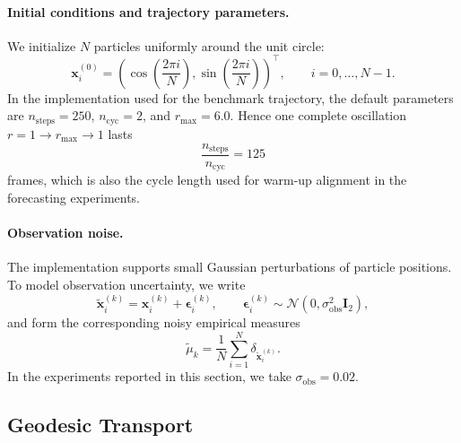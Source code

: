 \documentclass[11pt]{article}
\newcommand{\1}{\mathbf{1}}
\begin{document}
\paragraph{Initial conditions and trajectory parameters.}
We initialize \(N\) particles uniformly around the unit circle:
\begin{equation}\label{eq:swirl-init}
\mathbf{x}_i^{(0)} = 
\left(\cos\left(\frac{2\pi i}{N}\right), \sin\left(\frac{2\pi i}{N}\right)\right)^\top, 
\qquad i = 0, \ldots, N-1.
\end{equation}
In the implementation used for the benchmark trajectory, the default parameters are \(n_{\mathrm{steps}}=250\), \(n_{\mathrm{cyc}}=2\), and \(r_{\max}=6.0\). Hence one complete oscillation \(r=1\to r_{\max}\to 1\) lasts
\[
\frac{n_{\mathrm{steps}}}{n_{\mathrm{cyc}}}=125
\]
frames, which is also the cycle length used for warm-up alignment in the forecasting experiments.

\paragraph{Observation noise.}
The implementation supports small Gaussian perturbations of particle positions. To model observation uncertainty, we write
\begin{equation}\label{eq:swirl-noise}
\widetilde{\mathbf{x}}_i^{(k)} = \mathbf{x}_i^{(k)} + \boldsymbol{\epsilon}_i^{(k)}, 
\qquad \boldsymbol{\epsilon}_i^{(k)} \sim \mathcal{N}(0, \sigma_{\text{obs}}^2 \mathbf{I}_2),
\end{equation}
and form the corresponding noisy empirical measures
\[
\widetilde{\mu}_k = \frac{1}{N}\sum_{i=1}^N \delta_{\widetilde{\mathbf{x}}_i^{(k)}}.
\]
In the experiments reported in this section, we take \(\sigma_{\text{obs}}=0.02\).

\subsection{Geodesic Transport}\label{sec:geodesic}
\end{document}
